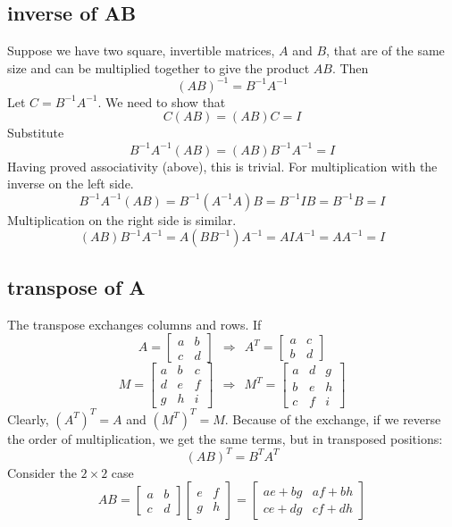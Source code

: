 \documentclass[11pt, oneside]{article}   	%
\begin{document}
\subsection*{inverse of AB}
Suppose we have two square, invertible matrices, $A$ and $B$, that are of the same size and can be multiplied together to give the product $AB$. Then
\[ (AB)^{-1} = B^{-1} A^{-1} \]
Let $C = B^{-1} A^{-1}$.  We need to show that
\[ C(AB) = (AB)C = I \]
Substitute
\[ B^{-1} A^{-1}(AB) = (AB)B^{-1} A^{-1} = I \]
Having proved associativity (above), this is trivial.  For multiplication with the inverse on the left side.
\[ B^{-1} A^{-1}(AB) = B^{-1} (A^{-1}A) B = B^{-1} I B = B^{-1} B = I \]
Multiplication on the right side is similar.
\[ (AB)B^{-1} A^{-1} = A (B B^{-1}) A^{-1} = A I A^{-1} = A A^{-1} = I \]

\subsection*{transpose of A}
The transpose exchanges columns and rows.  If
\[ A = 
\begin{bmatrix}
a & b \\
c & d 
\end{bmatrix} 
\ \ \Rightarrow
\ \ 
A^T =
\begin{bmatrix}
a & c \\
b & d 
\end{bmatrix}
\]
\[ M = 
\begin{bmatrix}
a & b & c \\
d & e & f \\
g & h & i
\end{bmatrix} 
\ \ \Rightarrow
\ \ 
M^T =
\begin{bmatrix}
a & d & g \\
b & e & h \\
c & f & i
\end{bmatrix}
\]
Clearly, $(A^T)^T = A$ and $(M^T)^T = M$.  Because of the exchange, if we reverse the order of multiplication, we get the same terms, but in transposed positions:
\[ (AB)^T = B^T A^T \]
Consider the $2 \times 2$ case
\[ AB = 
\begin{bmatrix}
a & b \\
c & d 
\end{bmatrix} 
\begin{bmatrix}
e & f \\
g & h 
\end{bmatrix} 
=
\begin{bmatrix}
ae + bg & af + bh \\
ce + dg & cf + dh 
\end{bmatrix}
\]
\end{document}
